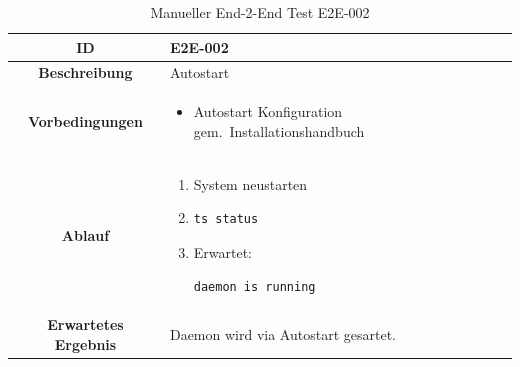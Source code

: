 \documentclass[a4paper,12pt]{report}
\begin{document}
    \begin{table}[h!]
        \centering
        \setlength{\leftmargini}{0.8cm}
        \begin{tabular}{|c|p{10cm}|}
            \hline
            \textbf{ID}                  & E2E-002                             \\ \hline
            \textbf{Beschreibung}        & Autostart                           \\ \hline
            \textbf{Vorbedingungen} &
            \begin{itemize}
                \item Autostart Konfiguration gem.\ Installationshandbuch
            \end{itemize} \\ \hline
            \textbf{Ablauf} &
            \begin{enumerate}
                \item System neustarten
                \item \begin{verbatim}ts status
                \end{verbatim}
                \item Erwartet: \begin{verbatim}daemon is running
                \end{verbatim}
            \end{enumerate} \\ \hline
            \textbf{Erwartetes Ergebnis} & Daemon wird via Autostart gesartet. \\ \hline
        \end{tabular}
        \caption{Manueller End-2-End Test E2E-002}\label{tab:e2e-2}
    \end{table}
\end{document}
